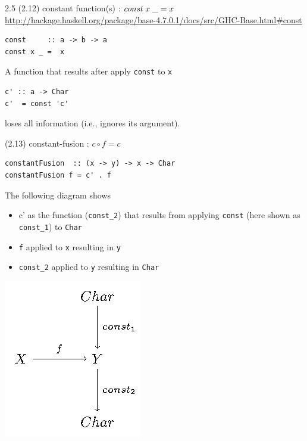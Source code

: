\documentclass[presentation]{beamer}
\begin{document}
\begin{frame}[fragile,label=sec-4]{2.5  (2.12) constant function(s) : $const \hspace{0.25em} x \hspace{0.25em} \_ =  x$}
 \url{http://hackage.haskell.org/package/base-4.7.0.1/docs/src/GHC-Base.html#const}

\begin{verbatim}
const     :: a -> b -> a
const x _ =  x
\end{verbatim}

A function that results after apply \texttt{const} to \texttt{x}

\begin{verbatim}
c' :: a -> Char
c'  = const 'c'
\end{verbatim}

loses all information (i.e., ignores its argument).

\begin{block}{(2.13) constant-fusion : $c \circ f = c$}
\begin{verbatim}
constantFusion  :: (x -> y) -> x -> Char
constantFusion f = c' . f
\end{verbatim}

The following diagram shows
\begin{itemize}
\item c' as the function (\texttt{const\_2}) that results from applying \texttt{const} (here shown as \texttt{const\_1}) to \texttt{Char}
\item \texttt{f} applied to \texttt{x} resulting in \texttt{y}
\item \texttt{const\_2} applied to \texttt{y} resulting in \texttt{Char}
\end{itemize}

\includegraphics[width=.9\linewidth]{./constant-fusion.png}


\end{block}
\end{frame}
\end{document}
